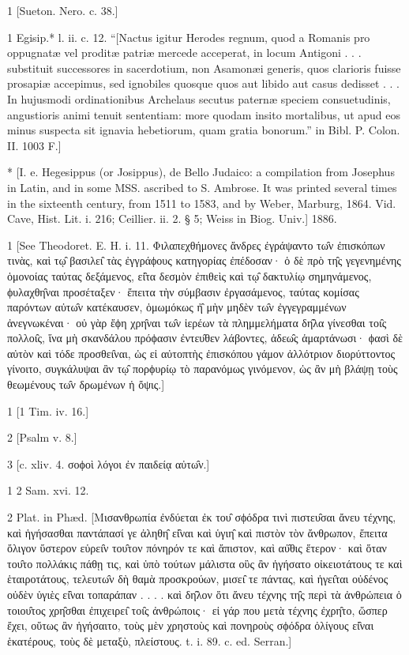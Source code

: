 1
[Sueton. Nero. c. 38.]

1
Egisip.* l. ii. c. 12. “[Nactus igitur Herodes regnum, quod a Romanis pro oppugnatæ vel proditæ patriæ mercede acceperat, in locum Antigoni . . . substituit successores in sacerdotium, non Asamonæi generis, quos clarioris fuisse prosapiæ accepimus, sed ignobiles quosque quos aut libido aut casus dedisset . . . In hujusmodi ordinationibus Archelaus secutus paternæ speciem consuetudinis, angustioris animi tenuit sententiam: more quodam insito mortalibus, ut apud eos minus suspecta sit ignavia hebetiorum, quam gratia bonorum.” in Bibl. P. Colon. II. 1003 F.]

*
[I. e. Hegesippus (or Josippus), de Bello Judaico: a compilation from Josephus in Latin, and in some MSS. ascribed to S. Ambrose. It was printed several times in the sixteenth century, from 1511 to 1583, and by Weber, Marburg, 1864. Vid. Cave, Hist. Lit. i. 216; Ceillier. ii. 2. § 5; Weiss in Biog. Univ.] 1886.

1
[See Theodoret. E. H. i. 11. Φιλαπεχθήμονες ἄνδρες ἐγράψαντο τω̑ν ἐπισκόπων τινὰς, καὶ τῳ̑ βασιλει̑ τὰς ἐγγράϕους κατηγορίας ἐπέδοσαν· ὁ δὲ πρὸ τη̑ς γεγενημένης ὁμονοίας ταύτας δεξάμενος, εἰ̑τα δεσμὸν ἐπιθεὶς καὶ τῳ̑ δακτυλίῳ σημηνάμενος, ϕυλαχθη̑ναι προσέταξεν· ἔπειτα τὴν σύμβασιν ἐργασάμενος, ταύτας κομίσας παρόντων αὐτω̑ν κατέκαυσεν, ὁμωμόκως ἠ̑ μὴν μηδὲν τω̑ν ἐγγεγραμμένων ἀνεγνωκέναι· οὐ γὰρ ἔϕη χρη̑ναι τω̑ν ἱερέων τὰ πλημμελήματα δη̑λα γίνεσθαι τοι̑ς πολλοι̑ς, ἵνα μὴ σκανδάλου πρόϕασιν ἐντευ̑θεν λάβοντες, ἀδεω̑ς ἁμαρτάνωσι· ϕασὶ δὲ αὐτὸν καὶ τόδε προσθει̑ναι, ὡς εἰ αὐτοπτὴς ἐπισκόπου γάμον ἀλλότριον διορύττοντος γίνοιτο, συγκάλυψαι ἂν τῳ̑ πορϕυρίῳ τὸ παρανόμως γινόμενον, ὡς ἂν μὴ βλάψῃ τοὺς θεωμένους τω̑ν δρωμένων ἡ ὄψις.]

1
[1 Tim. iv. 16.]

2
[Psalm v. 8.]

3
[c. xliv. 4. σοϕοὶ λόγοι ἐν παιδείᾳ αὐτω̑ν.]

1
2 Sam. xvi. 12.

2
Plat. in Phæd. [Μισανθρωπία ἐνδύεται ἐκ του̑ σϕόδρα τινὶ πιστευ̑σαι ἄνευ τέχνης, καὶ ἡγήσασθαι παντάπασί γε ἀληθη̑ εἰ̑ναι καὶ ὑγιη̑ καὶ πιστὸν τὸν ἄνθρωπον, ἔπειτα ὄλιγον ὕστερον εὑρει̑ν του̑τον πόνηρόν τε καὶ ἄπιστον, καὶ αὐ̑θις ἕτερον· καὶ ὅταν του̑το πολλάκις πάθῃ τις, καὶ ὑπὸ τούτων μάλιστα οὓς ἂν ἡγήσατο οἰκειοτάτους τε καὶ ἑταιροτάτους, τελευτω̑ν δὴ θαμὰ προσκρούων, μισει̑ τε πάντας, καὶ ἡγει̑ται οὐδένος οὐδὲν ὑγιὲς εἰ̑ναι τοπαράπαν . . . . καὶ δη̑λον ὅτι ἄνευ τέχνης τη̑ς περὶ τὰ ἀνθρώπεια ὁ τοιου̑τος χρη̑σθαι ἐπιχειρει̑ τοι̑ς ἀνθρώποις· εἰ γάρ που μετὰ τέχνης ἐχρη̑το, ὥσπερ ἔχει, οὕτως ἂν ἡγήσαιτο, τοὺς μὲν χρηστοὺς καὶ πονηροὺς σϕόδρα ὀλίγους εἰ̑ναι ἑκατέρους, τοὺς δὲ μεταξὺ, πλείστους. t. i. 89. c. ed. Serran.]

